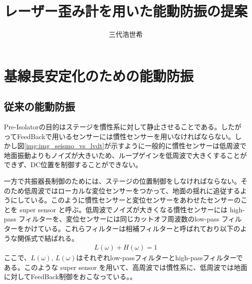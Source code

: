 \documentclass[a4paper,12pt]{jsarticle}
\title{レーザー歪み計を用いた能動防振の提案}
\author{三代浩世希}
\begin{document}
\setcounter{tocdepth}{3}
\maketitle
{}
\tableofcontents



\section{基線長安定化のための能動防振}
\subsection{従来の能動防振}
Pre-Isolatorの目的はステージを慣性系に対して静止させることである。したがってFeedBackで用いるセンサーには慣性センサーを用いなければならない。しかし図\ref{img:img_seismo_vs_lvdt}が示すように一般的に慣性センサーは低周波で地面振動よりもノイズが大きいため、ループゲインを低周波で大きくすることができず、DC位置を制御することができない。

一方で共振器長制御のためには、ステージの位置制御をしなければならない。そのため低周波ではローカルな変位センサーをつかって、地面の揺れに追従するようにしている。このように慣性センサーと変位センサーをあわせたセンサーのことを super sensor と呼ぶ\cite{hua2005low}。低周波でノイズが大きくなる慣性センサーには high-pass フィルターを、変位センサーには同じカットオフ周波数のlow-pass フィルターをかけている。これらフィルターは相補フィルターと呼ばれており以下のような関係式で結ばれる。
\begin{eqnarray}\label{eq:eq01}
  L(\omega) + H(\omega) = 1
\end{eqnarray}  
ここで、$L(\omega),\,L(\omega)$はそれぞれlow-passフィルターとhigh-passフィルターである。このような super sensor を用いて、高周波では慣性系に、低周波では地面に対してFeedBack制御をおこなっている。。
\end{document}
